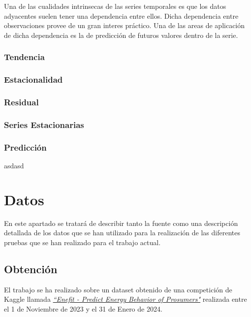 \documentclass[a4paper,12pt]{article}
\begin{document}
Una de las cualidades intrinsecas de las series temporales es 
que los datos adyacentes suelen tener una dependencia entre 
ellos. Dicha dependencia entre observaciones provee de un 
gran interes práctico. Una de las areas de aplicación de 
dicha dependencia es la de predicción de futuros valores dentro 
de la serie.

\subsubsection{Tendencia}

\subsubsection{Estacionalidad}

\subsubsection{Residual}

\subsubsection{Series Estacionarias}

\subsubsection{Predicción}

asdasd

\section{Datos}

En este apartado se tratará de describir tanto la fuente como 
una descripción detallada de los datos que se han utilizado
para la realización de las diferentes pruebas que se han 
realizado para el trabajo actual.

\subsection{Obtención}

El trabajo se ha realizado sobre un dataset obtenido de 
una competición de Kaggle llamada 
\href{https://www.kaggle.com/competitions/predict-energy-behavior-of-prosumers/data}{
    \textit{``Enefit - Predict Energy Behavior of Prosumers"}}
realizada entre el 1 de Noviembre de 2023 y el 31 de 
Enero de 2024.
\end{document}
